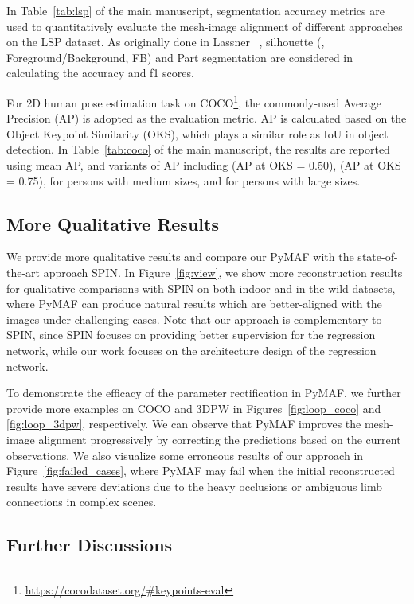 \documentclass[10pt,twocolumn,letterpaper]{article}
\begin{document}
In Table~\ref{tab:lsp} of the main manuscript, segmentation accuracy metrics are used to quantitatively evaluate the mesh-image alignment of different approaches on the LSP dataset.
As originally done in Lassner \etal~\cite{lassner2017unite}, silhouette (\ie, Foreground/Background, FB) and Part segmentation are considered in calculating the accuracy and f1 scores.


For 2D human pose estimation task on COCO\footnote{\url{https://cocodataset.org/\#keypoints-eval}}, the commonly-used Average Precision (AP) is adopted as the evaluation metric.
AP is calculated based on the Object Keypoint Similarity (OKS), which plays a similar role as IoU in object detection.
In Table~\ref{tab:coco} of the main manuscript, the results are reported using mean AP, and variants of AP including  (AP at OKS = 0.50),  (AP at OKS = 0.75),  for persons with medium sizes, and  for persons with large sizes.



\subsection{More Qualitative Results}
\label{sec:quan_eval}


We provide more qualitative results and compare our PyMAF with the state-of-the-art approach SPIN.
In Figure~\ref{fig:view}, we show more reconstruction results for qualitative comparisons with SPIN on both indoor and in-the-wild datasets, where PyMAF can produce natural results which are better-aligned with the images under challenging cases.
Note that our approach is complementary to SPIN, since SPIN focuses on providing better supervision for the regression network, while our work focuses on the architecture design of the regression network.

To demonstrate the efficacy of the parameter rectification in PyMAF, we further provide more examples on COCO and 3DPW in Figures~\ref{fig:loop_coco} and \ref{fig:loop_3dpw}, respectively.
We can observe that PyMAF improves the mesh-image alignment progressively by correcting the predictions based on the current observations.
We also visualize some erroneous results of our approach in Figure~\ref{fig:failed_cases}, where PyMAF may fail when the initial reconstructed results have severe deviations due to the heavy occlusions or ambiguous limb connections in complex scenes.

\subsection{Further Discussions}
\label{sec:discuss}
\end{document}
